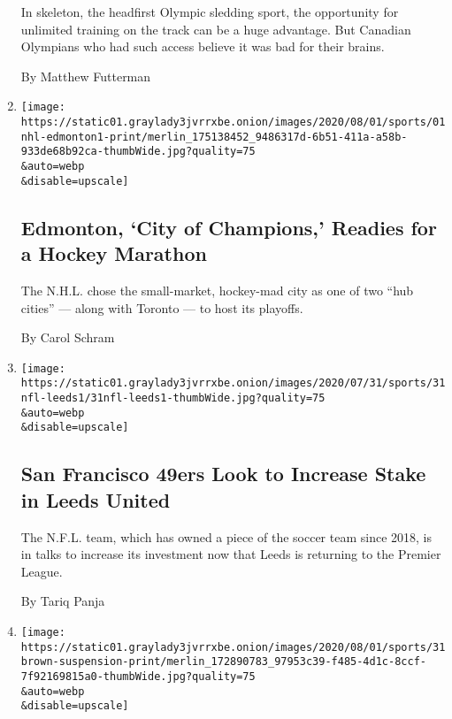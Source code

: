 \begin{enumerate}
  In skeleton, the headfirst Olympic sledding sport, the opportunity for
  unlimited training on the track can be a huge advantage. But Canadian
  Olympians who had such access believe it was bad for their brains.

  By Matthew Futterman
\item
  \href{/2020/08/01/sports/hockey/edmonton-nhl-playoffs.html}{}

  \texttt{[image: https://static01.graylady3jvrrxbe.onion/images/2020/08/01/sports/01nhl-edmonton1-print/merlin\_175138452\_9486317d-6b51-411a-a58b-933de68b92ca-thumbWide.jpg?quality=75\\\&auto=webp\\\&disable=upscale]}

  \hypertarget{edmonton-city-of-champions-readies-for-a-hockey-marathon}{%
  \subsection{Edmonton, `City of Champions,' Readies for a Hockey
  Marathon}\label{edmonton-city-of-champions-readies-for-a-hockey-marathon}}

  The N.H.L. chose the small-market, hockey-mad city as one of two ``hub
  cities'' --- along with Toronto --- to host its playoffs.

  By Carol Schram
\item
  \href{/2020/07/31/sports/soccer/leeds-united-san-francisco-49ers.html}{}

  \texttt{[image: https://static01.graylady3jvrrxbe.onion/images/2020/07/31/sports/31nfl-leeds1/31nfl-leeds1-thumbWide.jpg?quality=75\\\&auto=webp\\\&disable=upscale]}

  \hypertarget{san-francisco-49ers-look-to-increase-stake-in-leeds-united}{%
  \subsection{San Francisco 49ers Look to Increase Stake in Leeds
  United}\label{san-francisco-49ers-look-to-increase-stake-in-leeds-united}}

  The N.F.L. team, which has owned a piece of the soccer team since
  2018, is in talks to increase its investment now that Leeds is
  returning to the Premier League.

  By Tariq Panja
\item
  \href{/2020/07/31/sports/football/antonio-brown-suspension-nfl.html}{}

  \texttt{[image: https://static01.graylady3jvrrxbe.onion/images/2020/08/01/sports/31brown-suspension-print/merlin\_172890783\_97953c39-f485-4d1c-8ccf-7f92169815a0-thumbWide.jpg?quality=75\\\&auto=webp\\\&disable=upscale]}


\end{enumerate}
